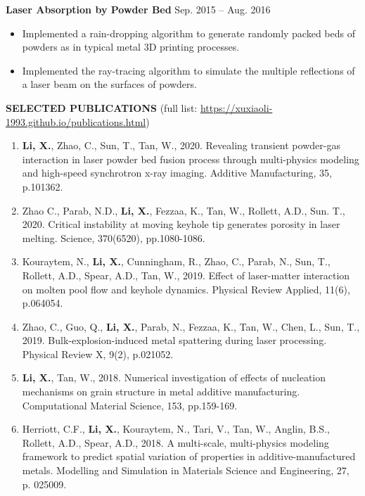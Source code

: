 \documentclass[11pt, letterpaper]{article}
\begin{document}
\vspace{3pt}

\textbf{Laser Absorption by Powder Bed} \hfill Sep. 2015 -- Aug. 2016
\begin{itemize}[leftmargin=*, labelsep=5mm]
   \item Implemented a rain-dropping algorithm to generate randomly packed beds of powders as in
      typical metal 3D printing processes.
   \item Implemented the ray-tracing algorithm to simulate the multiple reflections of a laser beam
      on the surfaces of powders.
\end{itemize}

\vspace{9pt}

\textbf{SELECTED PUBLICATIONS} \hfill (full list:  
\href{https://xuxiaoli-1993.github.io/publications.html}
{https://xuxiaoli-1993.github.io/publications.html})

\fullrule

\begin{enumerate}[leftmargin=*, labelsep=4mm]
   \item \textbf{Li, X.}, Zhao, C., Sun, T., Tan, W., 2020. Revealing transient powder-gas
      interaction in laser powder bed fusion process through multi-physics modeling and high-speed
      synchrotron x-ray imaging. Additive Manufacturing, 35, p.101362. 

   \item Zhao C., Parab, N.D., \textbf{Li, X.}, Fezzaa, K., Tan, W., Rollett, A.D., Sun. T., 2020.
      Critical instability at moving keyhole tip generates porosity in laser melting. Science,
      370(6520), pp.1080-1086.

   \item Kouraytem, N., \textbf{Li, X.}, Cunningham, R., Zhao, C., Parab, N., Sun, T., Rollett,
      A.D., Spear, A.D., Tan, W., 2019. Effect of laser-matter interaction on molten pool flow and
      keyhole dynamics. Physical Review Applied, 11(6), p.064054.

   \item Zhao, C., Guo, Q., \textbf{Li, X.}, Parab, N., Fezzaa, K., Tan, W., Chen, L., Sun, T.,
      2019. Bulk-explosion-induced metal spattering during laser processing. Physical Review X,
      9(2), p.021052.

   \item \textbf{Li, X.}, Tan, W., 2018. Numerical investigation of effects of nucleation mechanisms
      on grain structure in metal additive manufacturing. Computational Material Science, 153,
      pp.159-169.

   \item Herriott, C.F., \textbf{Li, X.}, Kouraytem, N., Tari, V., Tan, W., Anglin, B.S., Rollett, A.D.,
      Spear, A.D., 2018. A multi-scale, multi-physics modeling framework to predict spatial
      variation of properties in additive-manufactured metals. Modelling and Simulation in
      Materials Science and Engineering, 27, p. 025009.
\end{enumerate}
\end{document}
